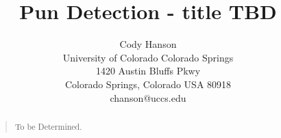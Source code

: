 \documentclass[letterpaper]{article}
\begin{document}
\title{Pun Detection - title TBD}
\author{Cody Hanson\\
University of Colorado Colorado Springs\\
1420 Austin Bluffs Pkwy\\
Colorado Springs, Colorado USA 80918\\
chanson@uccs.edu}
\maketitle
\begin{abstract}
\begin{quote}
To be Determined.
\end{quote}
\end{abstract}







 

\end{document}
